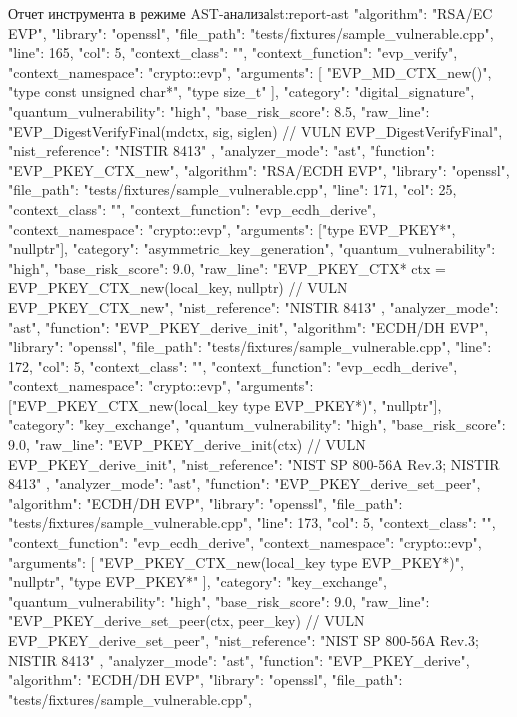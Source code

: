 \documentclass{itmo-vkr}
\begin{document}
\begin{itmolisting}[JSON]{Отчет инструмента в режиме AST-анализа}{lst:report-ast}
{{			"algorithm": "RSA/EC EVP",
			"library": "openssl",
			"file_path": "tests/fixtures/sample_vulnerable.cpp",
			"line": 165,
			"col": 5,
			"context_class": "",
			"context_function": "evp_verify",
			"context_namespace": "crypto::evp",
			"arguments": [
			"EVP_MD_CTX_new()",
			"type const unsigned char*",
			"type size_t"
			],
			"category": "digital_signature",
			"quantum_vulnerability": "high",
			"base_risk_score": 8.5,
			"raw_line": "EVP_DigestVerifyFinal(mdctx, sig, siglen) // VULN EVP_DigestVerifyFinal",
			"nist_reference": "NISTIR 8413"
		},
		{
			"analyzer_mode": "ast",
			"function": "EVP_PKEY_CTX_new",
			"algorithm": "RSA/ECDH EVP",
			"library": "openssl",
			"file_path": "tests/fixtures/sample_vulnerable.cpp",
			"line": 171,
			"col": 25,
			"context_class": "",
			"context_function": "evp_ecdh_derive",
			"context_namespace": "crypto::evp",
			"arguments": ["type EVP_PKEY*", "nullptr"],
			"category": "asymmetric_key_generation",
			"quantum_vulnerability": "high",
			"base_risk_score": 9.0,
			"raw_line": "EVP_PKEY_CTX* ctx = EVP_PKEY_CTX_new(local_key, nullptr) // VULN EVP_PKEY_CTX_new",
			"nist_reference": "NISTIR 8413"
		},
		{
			"analyzer_mode": "ast",
			"function": "EVP_PKEY_derive_init",
			"algorithm": "ECDH/DH EVP",
			"library": "openssl",
			"file_path": "tests/fixtures/sample_vulnerable.cpp",
			"line": 172,
			"col": 5,
			"context_class": "",
			"context_function": "evp_ecdh_derive",
			"context_namespace": "crypto::evp",
			"arguments": ["EVP_PKEY_CTX_new(local_key type EVP_PKEY*)", "nullptr"],
			"category": "key_exchange",
			"quantum_vulnerability": "high",
			"base_risk_score": 9.0,
			"raw_line": "EVP_PKEY_derive_init(ctx) // VULN EVP_PKEY_derive_init",
			"nist_reference": "NIST SP 800-56A Rev.3; NISTIR 8413"
		},
		{
			"analyzer_mode": "ast",
			"function": "EVP_PKEY_derive_set_peer",
			"algorithm": "ECDH/DH EVP",
			"library": "openssl",
			"file_path": "tests/fixtures/sample_vulnerable.cpp",
			"line": 173,
			"col": 5,
			"context_class": "",
			"context_function": "evp_ecdh_derive",
			"context_namespace": "crypto::evp",
			"arguments": [
			"EVP_PKEY_CTX_new(local_key type EVP_PKEY*)",
			"nullptr",
			"type EVP_PKEY*"
			],
			"category": "key_exchange",
			"quantum_vulnerability": "high",
			"base_risk_score": 9.0,
			"raw_line": "EVP_PKEY_derive_set_peer(ctx, peer_key) // VULN EVP_PKEY_derive_set_peer",
			"nist_reference": "NIST SP 800-56A Rev.3; NISTIR 8413"
		},
		{
			"analyzer_mode": "ast",
			"function": "EVP_PKEY_derive",
			"algorithm": "ECDH/DH EVP",
			"library": "openssl",
			"file_path": "tests/fixtures/sample_vulnerable.cpp",
}}
\end{itmolisting}
\end{document}
